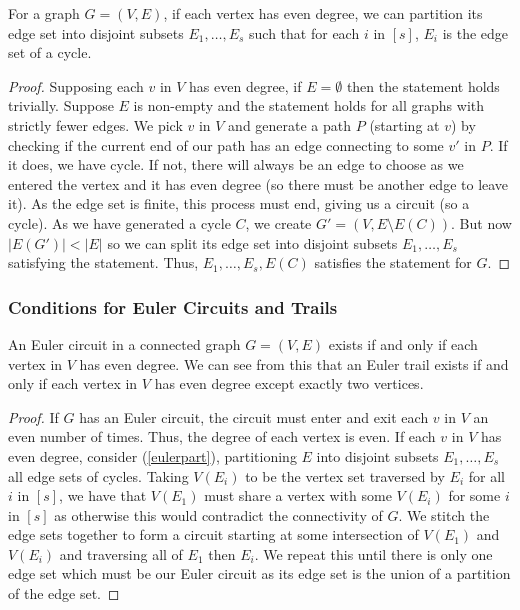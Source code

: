 For a graph $G = (V, E)$, if each vertex has even degree, we can
partition its edge set into disjoint subsets $E_1, \ldots, E_s$
such that for each $i$ in $[s]$, $E_i$ is the edge set of a cycle.
\begin{proof}
    Supposing each $v$ in $V$ has even degree, if $E = \emptyset$ then
    the statement holds trivially. Suppose $E$ is non-empty and the
    statement holds for all graphs with strictly fewer edges. We
    pick $v$ in $V$ and generate a path $P$ (starting at $v$) 
    by checking if the current end of our path has an edge connecting 
    to some $v'$ in $P$. If it does, we have cycle. If not, there will 
    always be an edge to choose as we entered the vertex and it has even degree 
    (so there must be another edge to leave it). As the edge set is finite,
    this process must end, giving us a circuit (so a cycle). As we
    have generated a cycle $C$, we create $G' = (V, E \setminus E(C))$. 
    But now $|E(G')| < |E|$ so we can split its edge set into
    disjoint subsets $E_1, \ldots, E_s$ satisfying the statement.
    Thus, $E_1, \ldots, E_s, E(C)$ satisfies the statement for $G$.
\end{proof}

\subsubsection{Conditions for Euler Circuits and Trails}

An Euler circuit in a connected graph $G = (V, E)$ exists if and only 
if each vertex in $V$ has even degree. We can see from this that
an Euler trail exists if and only if each vertex in $V$ has even
degree except exactly two vertices.
\begin{proof}
  If $G$ has an Euler circuit, the circuit must enter and exit each $v$
  in $V$ an even number of times. Thus, the degree of each vertex is even.
  If each $v$ in $V$ has even degree, consider (\ref{eulerpart}), partitioning
  $E$ into disjoint subsets $E_1, \ldots, E_s$ all edge sets of cycles.
  Taking $V(E_i)$ to be the vertex set traversed by $E_i$ for all $i$ in $[s]$,
  we have that $V(E_1)$ must share a vertex with some $V(E_i)$ for some $i$ in $[s]$
  as otherwise this would contradict the connectivity of $G$.
  We stitch the edge sets together to form a circuit starting at some
  intersection of $V(E_1)$ and $V(E_i)$ and traversing all of
  $E_1$ then $E_i$. We repeat this until there is only one edge set
  which must be our Euler circuit as its edge set is the union of a
  partition of the edge set.
\end{proof}


